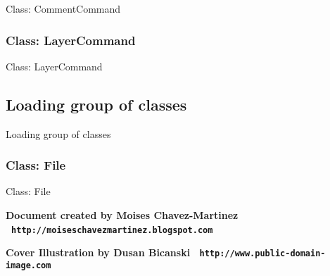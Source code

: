 \documentclass[11pt,twoside,openany,x11names,svgnames]{memoir}
\begin{document}
Class: CommentCommand

\subsubsection{Class: LayerCommand}\label{Class-LayerCommand}

Class: LayerCommand

\subsection{Loading group of classes}\label{Loading-group-of-classes}

Loading group of classes

\subsubsection{Class: File}\label{Class-File}

Class: File

\cleartoverso


\enlargethispage{3\baselineskip}
\thispagestyle{empty}
\pagecolor[HTML]{0E0407}

\begin{center}
\begin{minipage}{.8\textwidth}
\color{Cornsilk}\Large\bfseries

\end{minipage}
\end{center}


\begin{center}

\vspace*{\baselineskip}

\textbf{\textcolor{LightGoldenrod!50!Gold}{Document created by Moises Chavez-Martinez \textbullet\ \texttt{http://moiseschavezmartinez.blogspot.com}}}

\vspace*{\baselineskip}

\textbf{\textcolor{LightGoldenrod}{Cover Illustration by Dusan Bicanski \textbullet\ \texttt{http://www.public-domain-image.com}}}
\end{center}
\end{document}

